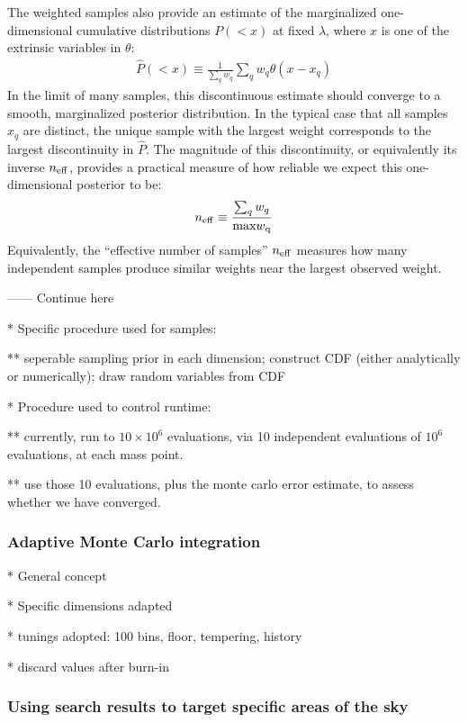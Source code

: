 \documentclass[twocolumn,prd,nofootinbib]{revtex4}
\newcommand\editremark[1]{{\color{red} #1}}
\begin{document}
The weighted samples also provide an estimate of the marginalized one-dimensional cumulative distributions $P(<x)$ at
fixed $\lambda$, where $x$ is one of the extrinsic variables in $\theta$:
\begin{eqnarray}
\hat{P}(<x) \equiv \frac{1}{\sum_q w_q} \sum_q w_q \theta(x-x_q)
\end{eqnarray}
In the limit of many samples, this discontinuous estimate should converge to a smooth, marginalized posterior distribution.  
In the typical case that all samples $x_q$ are distinct, the unique sample with the largest weight corresponds to the
largest discontinuity in $\hat{P}$.  The magnitude of this discontinuity, or equivalently its inverse $n_{\rm eff}$,
provides a practical measure of how reliable we expect this one-dimensional posterior to be:
\begin{eqnarray}
n_{\rm eff} \equiv \frac{\sum_q w_q}{\text{max} w_{\rm q}}
\end{eqnarray}
Equivalently, the ``effective number of samples'' $n_{\rm eff}$ measures how many independent samples produce similar
weights near the largest observed weight.  

------ \editremark{Continue here}

* Specific procedure used for samples:

** seperable sampling prior in each dimension; construct CDF (either analytically or
numerically); draw random variables from CDF


* Procedure used to control runtime:

** currently, run to $10\times10^6$ evaluations, via 10 independent evaluations of $10^6$ evaluations, at each mass
point.

** use those 10 evaluations, plus the monte carlo error estimate, to assess whether we have converged.


\subsubsection{Adaptive Monte Carlo integration}

* General concept

* Specific dimensions adapted

* tunings adopted: 100 bins, floor, tempering, history

* discard values after burn-in

\subsubsection{Using search results to target specific areas of the sky}
\end{document}
